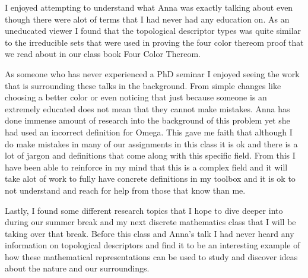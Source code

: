 \documentclass{article}
\begin{document}
I enjoyed attempting to understand what Anna was exactly talking about even though there were alot of terms that I had never had any education on. As an uneducated viewer 
I found that the topological descriptor types was quite similar to the irreducible sets that were used in proving the four color thereom proof that we read about in 
our class book Four Color Thereom.

As someone who has never experienced a PhD seminar I enjoyed seeing the work that is surrounding these talks in the background. From simple changes like choosing a better 
color or even noticing that just because someone is an extremely educated does not mean that they cannot make mistakes. Anna has done immense amount of research into the 
background of this problem yet she had used an incorrect definition for Omega. This gave me faith that although I do make mistakes in many of our assignments in this class 
it is ok and there is a lot of jargon and definitions that come along with this specific field. From this I have been able to reinforce in my mind that this is a complex 
field and it will take alot of work to fully have concrete definitions in my toolbox and it is ok to not understand and reach for help from those that know than me.

Lastly, I found some different research topics that I hope to dive deeper into during our summer break and my next discrete mathematics class that I will be taking over 
that break. Before this class and Anna's talk I had never heard any information on topological descriptors and find it to be an interesting example of how these mathematical 
representations can be used to study and discover ideas about the nature and our surroundings.
\end{document}
